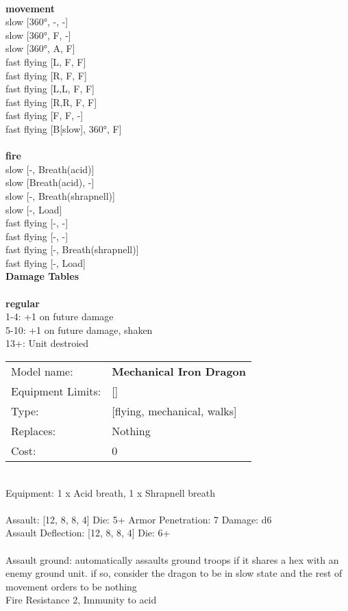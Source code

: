 \noindent 

\ \\ {\bf movement } \\
slow [360°, -, -] \\
slow [360°, F, -] \\
slow [360°, A, F] \\
fast flying [L, F, F] \\
fast flying [R, F, F] \\
fast flying [L,L, F, F] \\
fast flying [R,R, F, F] \\
fast flying [F, F, -] \\
fast flying [B[slow], 360°, F] \\
\ \\ {\bf fire } \\
slow [-, Breath(acid)] \\
slow [Breath(acid), -] \\
slow [-, Breath(shrapnell)] \\
slow [-, Load] \\
fast flying [-, -] \\
fast flying [-, -] \\
fast flying [-, Breath(shrapnell)] \\
fast flying [-, Load] \\


{\bf Damage Tables} \\
\ \\ {\bf regular } \\
1-4: +1 on future damage \\
5-10: +1 on future damage, shaken \\
13+: Unit destroied \\


\noindent
\begin{tabular}{ll}
Model name: &{\bf Mechanical Iron Dragon } \\
Equipment Limits: &[] \\
Type: &[flying, mechanical, walks] \\
Replaces: &Nothing \\
Cost: & 0\\
\end{tabular}
\ \\
Equipment: 1 x Acid breath, 1 x Shrapnell breath \\
\ \\
Assault: [12, 8, 8, 4] Die: 5+ Armor Penetration: 7 Damage: d6 \\
Assault Deflection: [12, 8, 8, 4] Die: 6+\\
\indent  
\ \\
Assault ground: automatically assaults ground troops if it shares a hex with an enemy ground unit. if so, consider the dragon to be in slow state and the rest of movement orders to be nothing\\ 
Fire Resistance 2, Immunity to acid\\ 

